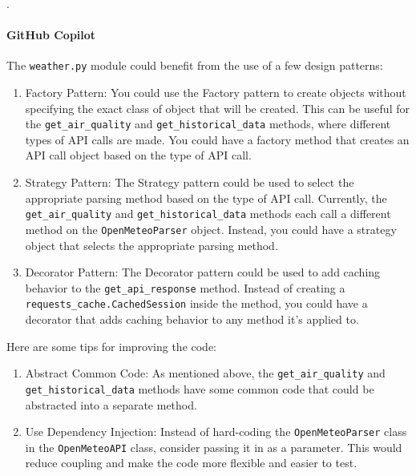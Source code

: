 \documentclass[FM,DP]{tulthesis}
\begin{document}
		\cite{enum}.
		\vspace{0.6em}
		\begin{tcolorbox}[colback=white,colframe=black]
			\paragraph{GitHub Copilot}
			
			The \verb|weather.py| module could benefit from the use of a few design patterns:
			
			\begin{enumerate}
				\item Factory Pattern: You could use the Factory pattern to create objects without specifying the exact class of object that will be created. This can be useful for the \verb|get_air_quality| and \verb|get_historical_data| methods, where different types of API calls are made. You could have a factory method that creates an API call object based on the type of API call.
				
				\item Strategy Pattern: The Strategy pattern could be used to select the appropriate parsing method based on the type of API call. Currently, the \verb|get_air_quality| and \verb|get_historical_data| methods each call a different method on the \verb|OpenMeteoParser| object. Instead, you could have a strategy object that selects the appropriate parsing method.
				
				\item Decorator Pattern: The Decorator pattern could be used to add caching behavior to the \verb|get_api_response| method. Instead of creating a \verb|requests_cache.CachedSession| inside the method, you could have a decorator that adds caching behavior to any method it's applied to.
			\end{enumerate}
			
			Here are some tips for improving the code:
			
			\begin{enumerate}
				\item Abstract Common Code: As mentioned above, the \verb|get_air_quality| and \verb|get_historical_data| methods have some common code that could be abstracted into a separate method.
				
				\item Use Dependency Injection: Instead of hard-coding the \verb|OpenMeteoParser| class in the \verb|OpenMeteoAPI| class, consider passing it in as a parameter. This would reduce coupling and make the code more flexible and easier to test.
				

\end{enumerate}
\end{tcolorbox}
\end{document}
